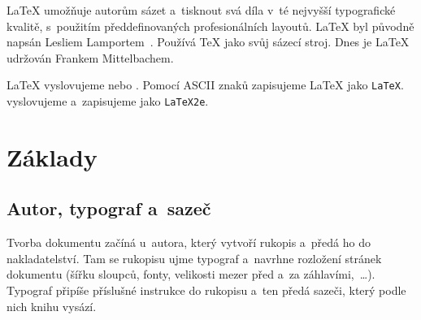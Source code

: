 \LaTeX{} umožňuje autorům sázet a~tisknout svá díla v~té nejvyšší typografické
kvalitě, s~použitím předdefinovaných profesionálních layoutů.
\LaTeX{} byl původně napsán Lesliem Lamportem~\cite{manual}.
Používá \TeX{} jako svůj sázecí stroj. Dnes je \LaTeX{}
udržován Frankem Mittelbachem.
 

\LaTeX{} vyslovujeme  nebo .
Pomocí ASCII znaků zapisujeme \LaTeX{} jako \texttt{LaTeX}. \LaTeXe{}
vyslovujeme  a~zapisujeme jako \texttt{LaTeX2e}.


%

\section{Základy}
 
\subsection{Autor, typograf a~sazeč}

Tvorba dokumentu začíná u~autora, který vytvoří rukopis a~předá
ho do nakladatelství. Tam se rukopisu ujme typograf a~navrhne
rozložení stránek dokumentu (šířku sloupců, fonty, velikosti
mezer před a~za záhlavími,~\ldots). Typograf připíše příslušné
instrukce do rukopisu a~ten předá sazeči, který podle nich
knihu vysází.

